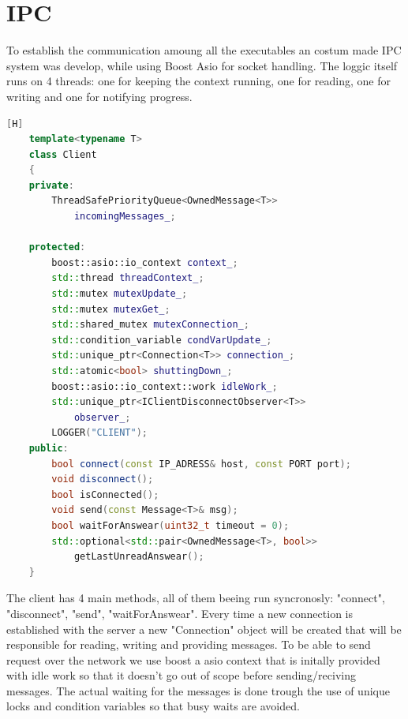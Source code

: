 \documentclass[17pt]{report}
\begin{document}
\pagebreak
\section{IPC}
\indent \indent
To establish the communication amoung all the executables an costum made IPC system
was develop, while using Boost Asio for socket handling. The loggic 
itself runs on 4 threads: one for keeping the context running, one for reading,
one for writing and one for notifying progress.

\begin{lstlisting}[caption={Client template}, language = C++][H]
    template<typename T>
    class Client
    {
    private:
        ThreadSafePriorityQueue<OwnedMessage<T>>
            incomingMessages_;

    protected:
        boost::asio::io_context context_;
        std::thread threadContext_;
        std::mutex mutexUpdate_;
        std::mutex mutexGet_;
        std::shared_mutex mutexConnection_;
        std::condition_variable condVarUpdate_;
        std::unique_ptr<Connection<T>> connection_;
        std::atomic<bool> shuttingDown_;
        boost::asio::io_context::work idleWork_; 
        std::unique_ptr<IClientDisconnectObserver<T>> 
            observer_; 
        LOGGER("CLIENT");
    public:
        bool connect(const IP_ADRESS& host, const PORT port);
        void disconnect();
        bool isConnected();
        void send(const Message<T>& msg);
        bool waitForAnswear(uint32_t timeout = 0);
        std::optional<std::pair<OwnedMessage<T>, bool>>
            getLastUnreadAnswear();
    }
\end{lstlisting}

The client has 4 main methods, all of them beeing run syncronosly:
"connect", "disconnect", "send", "waitForAnswear". Every time a 
new connection is established with the server a new "Connection"
object will be created that will be responsible for reading, writing 
and providing messages. To be able to send request over the network
we use boost a asio context that is initally provided with idle work 
so that it doesn't go out of scope before sending/reciving messages. 
The actual waiting for the messages is done trough the use of unique 
locks and condition variables so that busy waits are avoided.
\pagebreak
\end{document}
